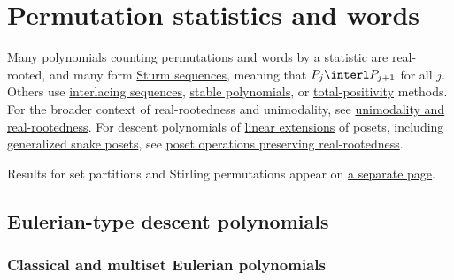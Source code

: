 


\section[realRootedWords]{Permutation statistics and words}

Many polynomials counting permutations and words by a statistic are
real-rooted, and many form
\hyperref[sturmSequenceDefinition]{Sturm sequences}, meaning that
\(P_j\interl P_{j+1}\) for all \(j\).  Others use
\hyperref[interlacingSequenceDefinition]{interlacing sequences},
\hyperref[stablePolynomial]{stable polynomials}, or
\hyperref[polyaFrequency]{total-positivity} methods.  For the broader
context of real-rootedness and unimodality, see
\hyperref[polynomialRootIntro]{unimodality and real-rootedness}.
For descent polynomials of \hyperref[linearExtension]{linear extensions} of
posets, including
\hyperref[generalizedSnakeRealRooted]{generalized snake posets}, see
\hyperref[posetRealRooted]{poset operations preserving real-rootedness}.

Results for set partitions and Stirling permutations appear on
\hyperref[sturmSetPartitions]{a separate page}.


\subsection[sturmEulerian]{Eulerian-type descent polynomials}

\subsubsection[classicalMultisetEulerianRealRooted]{Classical and multiset Eulerian polynomials}

